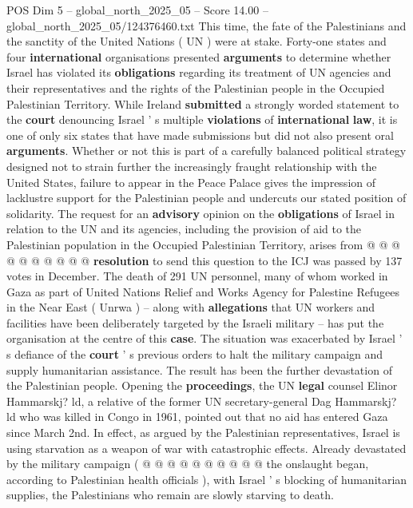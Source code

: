 \begin{textsample}{POS Dim 5 – global\_north\_2025\_05 – Score 14.00 – global\_north\_2025\_05/124376460.txt}  \label{ex:f5_pos_136}
This time, the fate of the Palestinians and the sanctity of the United Nations ( UN ) were at stake.
Forty-one states and four \textbf{international} organisations presented \textbf{arguments} to determine whether Israel has violated its \textbf{obligations} regarding its treatment of UN agencies and their representatives and the rights of the Palestinian people in the Occupied Palestinian Territory.
While Ireland \textbf{submitted} a strongly worded statement to the \textbf{court} denouncing Israel ' s multiple \textbf{violations} of \textbf{international} \textbf{law}, it is one of only six states that have made submissions but did not also present oral \textbf{arguments}.
Whether or not this is part of a carefully balanced political strategy designed not to strain further the increasingly fraught relationship with the United States, failure to appear in the Peace Palace gives the impression of lacklustre support for the Palestinian people and undercuts our stated position of solidarity.
The request for an \textbf{advisory} opinion on the \textbf{obligations} of Israel in relation to the UN and its agencies, including the provision of aid to the Palestinian population in the Occupied Palestinian Territory, arises from @ @ @ @ @ @ @ @ @ @ \textbf{resolution} to send this question to the ICJ was passed by 137 votes in December.
The death of 291 UN personnel, many of whom worked in Gaza as part of United Nations Relief and Works Agency for Palestine Refugees in the Near East ( Unrwa ) -- along with \textbf{allegations} that UN workers and facilities have been deliberately targeted by the Israeli military -- has put the organisation at the centre of this \textbf{case}.
The situation was exacerbated by Israel ' s defiance of the \textbf{court} ' s previous orders to halt the military campaign and supply humanitarian assistance.
The result has been the further devastation of the Palestinian people.
Opening the \textbf{proceedings}, the UN \textbf{legal} counsel Elinor Hammarskj? ld, a relative of the former UN secretary-general Dag Hammarskj? ld who was killed in Congo in 1961, pointed out that no aid has entered Gaza since March 2nd.
In effect, as argued by the Palestinian representatives, Israel is using starvation as a weapon of war with catastrophic effects.
Already devastated by the military campaign ( @ @ @ @ @ @ @ @ @ @ the onslaught began, according to Palestinian health officials ), with Israel ' s blocking of humanitarian supplies, the Palestinians who remain are slowly starving to death.

\end{textsample}
